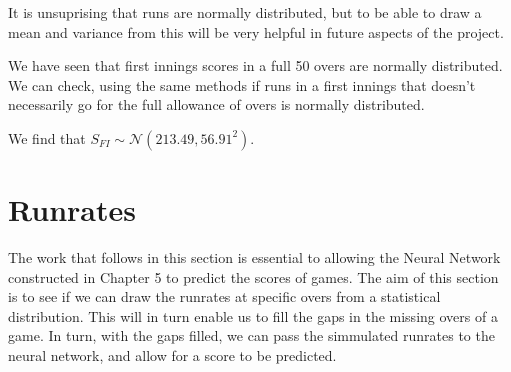 \begin{figure}[h]
    \centering
    \qquad
    \label{errDistAndQQRunsScored}
\end{figure}

It is unsuprising that runs are normally distributed, but to be able to draw a mean and variance from this will be very helpful in future aspects of the project.

We have seen that first innings scores in a full 50 overs are normally distributed. We can check, using the same methods if runs in a first innings that 
doesn't necessarily go for the full allowance of overs is normally distributed. 

We find that $S_{FI} \sim \mathcal{N}(213.49,56.91^2)$. 

\section{Runrates}
\label{exprr}
The work that follows in this section is essential to allowing the Neural Network constructed in Chapter 5 to predict the scores of games. The aim of this section is 
to see if we can draw the runrates at specific overs from a statistical distribution. This will in turn enable us to fill the gaps in the missing overs of a game. In turn, 
with the gaps filled, we can pass the simmulated runrates to the neural network, and allow for a score to be predicted. 

